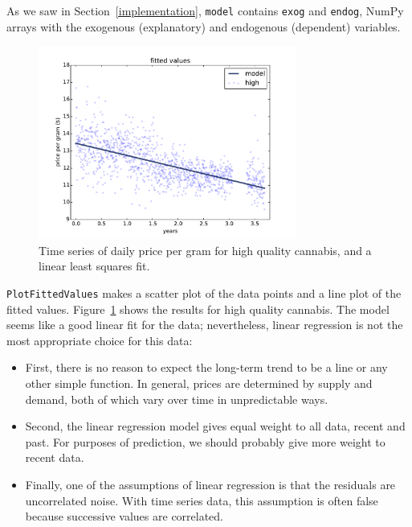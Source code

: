 \documentclass[12pt]{book}
\begin{document}
As we saw in Section~\ref{implementation}, {\tt model} contains
{\tt exog} and {\tt endog}, NumPy arrays with the exogenous
(explanatory) and endogenous (dependent) variables.

\begin{figure}
\centerline{\includegraphics[height=2.5in]{figs/timeseries2.pdf}}
\caption{Time series of daily price per gram for high quality cannabis,
and a linear least squares fit.}
\label{timeseries2}
\end{figure}

{\tt PlotFittedValues} makes a scatter plot of the data points and a line
plot of the fitted values.  Figure~\ref{timeseries2} shows the results
for high quality cannabis.  The model seems like a good linear fit
for the data; nevertheless, linear regression is not the most 
appropriate choice for this data:

\begin{itemize}

\item First, there is no reason to expect the long-term trend to be a
  line or any other simple function.  In general, prices are
  determined by supply and demand, both of which vary over time in
  unpredictable ways.

\item Second, the linear regression model gives equal weight to all
  data, recent and past.  For purposes of prediction, we should
  probably give more weight to recent data.

\item Finally, one of the assumptions of linear regression is that the
  residuals are uncorrelated noise.  With time series data, this
  assumption is often false because successive values are correlated.

\end{itemize}
\end{document}
